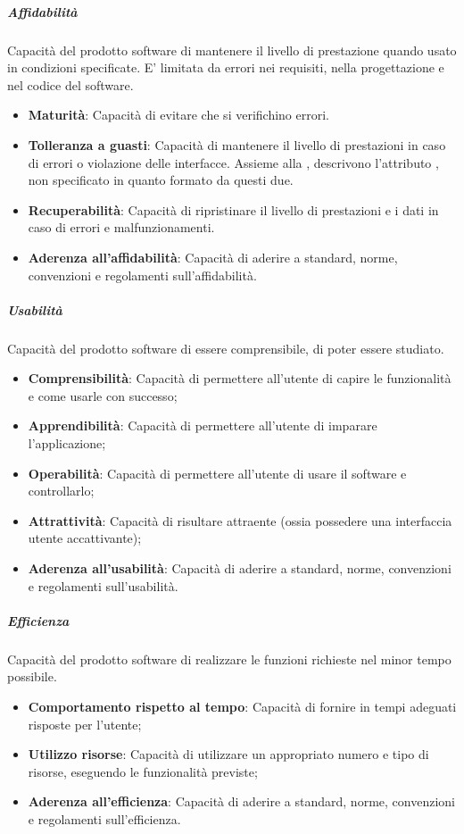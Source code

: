 \subparagraph{Affidabilità}
Capacità del prodotto software di mantenere il livello di prestazione quando usato in condizioni specificate.
E’ limitata da errori nei requisiti, nella progettazione e nel codice del software.
\begin{itemize}
\item \textbf{Maturità}: Capacità di evitare che si verifichino errori.
\item \textbf{Tolleranza a guasti}: Capacità di mantenere il livello di prestazioni in caso di errori o violazione delle interfacce. Assieme alla , descrivono l’attributo , non specificato in quanto formato da questi due.
\item \textbf{Recuperabilità}: Capacità di ripristinare il livello di prestazioni e i dati in caso di errori e malfunzionamenti.
\item \textbf{Aderenza all’affidabilità}: Capacità di aderire a standard, norme, convenzioni e regolamenti sull’affidabilità.
\end{itemize}

\subparagraph{Usabilità}
Capacità del prodotto software di essere comprensibile, di poter essere studiato.
\begin{itemize}
\item \textbf{Comprensibilità}: Capacità di permettere all’utente di capire le funzionalità e come usarle con successo;
\item \textbf{Apprendibilità}: Capacità di permettere all’utente di imparare l’applicazione;
\item \textbf{Operabilità}: Capacità di permettere all’utente di usare il software e controllarlo;
\item \textbf{Attrattività}: Capacità di risultare attraente (ossia possedere una interfaccia utente accattivante);
\item \textbf{Aderenza all’usabilità}: Capacità di aderire a standard, norme, convenzioni e regolamenti sull’usabilità.
\end{itemize}

\subparagraph{Efficienza}
Capacità del prodotto software di realizzare le funzioni richieste nel minor tempo possibile.
\begin{itemize}
\item \textbf{Comportamento rispetto al tempo}: Capacità di fornire in tempi adeguati risposte per l’utente;
\item \textbf{Utilizzo risorse}: Capacità di utilizzare un appropriato numero e tipo di risorse, eseguendo le funzionalità previste;
\item \textbf{Aderenza all’efficienza}: Capacità di aderire a standard, norme, convenzioni e regolamenti sull’efficienza.
\end{itemize}


